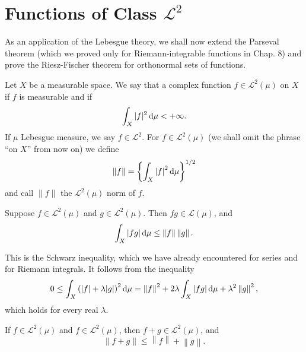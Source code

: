 
\section{Functions of Class $\mathscr{L}^2$}

As an application of the Lebesgue theory, 
we shall now extend the Parseval theorem 
(which we proved only for Riemann-integrable functions in Chap. 8)
and prove the Riesz-Fischer theorem for orthonormal sets of functions.

\begin{mydef}
    \label{mydef:11.34}
    Let $X$ be a measurable space. 
    We say that a complex
    function $f \in \mathscr{L}^2(\mu)$ on $X$ if $f$ is measurable and if
    \begin{equation*}
        \int_X |f|^2 \d \mu < +\infty .
    \end{equation*}
    If $\mu$ Lebesgue measure, 
    we say $f \in \mathscr{L}^2$. 
    For $f \in \mathscr{L}^2(\mu)$
    (we shall omit the phrase ``on $X$'' from now on) we define
    \begin{equation*}
        \left\| f \right\| =
        \left\{ \int_X \left| f \right|^2 \d \mu \right\}^{1/2}
    \end{equation*}
    and call $\|f\|$ the $\mathscr{L}^2(\mu)$ norm of $f$.
\end{mydef}

\begin{thm}
    \label{thm:11.35}
    Suppose $ f \in \mathscr{L}^2(\mu)$ 
    and     $ g \in \mathscr{L}^2(\mu)$. 
    Then    $fg \in \mathscr{L}  (\mu)$, 
    and
    \begin{equation}
        \label{eq:11.98}
        \int_X \left| fg \right| \d \mu \leq
        \left\| f \right\| \left\| g \right\| .
    \end{equation}
\end{thm}

This is the Schwarz inequality, 
which we have already encountered for series and for Riemann integrals. 
It follows from the inequality 
\begin{equation*}
    0 \leq 
    \int_X \left( | f | + \lambda | g |  \right)^2 \d \mu =
    \left\| f \right\|^2 + 
    2 \lambda \int_X | fg | \d \mu + \lambda^2 \left\| g \right\|^2 ,
\end{equation*}
which holds for every real $\lambda$.

\begin{thm}
    \label{thm:11.36}
    If   $f \in \mathscr{L}^2(\mu)$
    and  $f \in \mathscr{L}^2(\mu)$,
    then $f + g \in \mathscr{L}^2(\mu)$,
    and 
    \begin{equation*}
        \left\| f + g \right\| \leq
        \left\| f \right\| + \left\| g \right\| .
    \end{equation*}
\end{thm}

